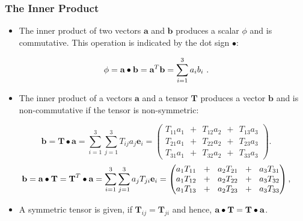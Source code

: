 \documentclass[MathematicsNumericsDerivationsAndOpenFOAM.tex]{subfiles}
\begin{document}
\subsubsection{The Inner Product}
%
%
\begin{itemize}
    \item The inner product of two vectors $\textbf{a}$ and $\textbf{b}$
    produces a scalar $\phi$ and is commutative. This operation is indicated
    by the dot sign $\bullet$:
\end{itemize}
%
%
\begin{equation}
 \phi = \textbf{a} \bullet \textbf{b} = \textbf{a} ^T \textbf{b} = \sum_{i=1}^{3} a_i b_i ~.
 \label{EQUATION::innerProductVV}
\end{equation}
%
%
%
\begin{itemize}
    \item The inner product of a vectors $\textbf{a}$ and a tensor
    $\textbf{T}$ produces a vector $\textbf{b}$ and is non-commutative
    if the tensor is non-symmetric:
\end{itemize}
%
%
\begin{equation}
 \textbf{b} = \textbf{T} \bullet \textbf{a} =
 \sum_{i=1}^{3}\sum_{j=1}^{3} T_{ij} a_j   \textbf{e}_i
 =
  \left(
  \begin{matrix}
   T_{11} a_1 ~ ~ + ~ ~ T_{12} a_2 ~ ~ + ~ ~ T_{13} a_3 \\
   T_{21} a_1 ~ ~ + ~ ~ T_{22} a_2 ~ ~ + ~ ~ T_{23} a_3 \\
   T_{31} a_1 ~ ~ + ~ ~ T_{32} a_2 ~ ~ + ~ ~ T_{33} a_3
  \end{matrix}
  \right).
  \label{EQUATION::innerProductTV}
\end{equation}
%
%
\begin{equation}
 \textbf{b} = \textbf{a} \bullet \textbf{T}
 =
 \textbf{T} ^T \bullet \textbf{a}
 =
 \sum_{i=1}^{3}\sum_{j=1}^{3} a_j T_{ji}  \textbf{e}_i
 =
  \left(
  \begin{matrix}
   a_1 T_{11} ~ ~ + ~ ~ a_2 T_{21} ~ ~ + ~ ~ a_3 T_{31} \\
   a_1 T_{12} ~ ~ + ~ ~ a_2 T_{22} ~ ~ + ~ ~ a_3 T_{32} \\
   a_1 T_{13} ~ ~ + ~ ~ a_2 T_{23} ~ ~ + ~ ~ a_3 T_{33}
  \end{matrix}
  \right),
  \label{EQUATION::innerProductVT}
\end{equation}
%
%
\begin{itemize}
   \item[] A symmetric tensor is given, if $\textbf{T}_{ij} = \textbf{T}_{ji}$
   and hence, $\textbf{a}\bullet\textbf{T} = \textbf{T} \bullet \textbf{a}$.
\end{itemize}
%
%
%
%
%
%
%
%
\end{document}

